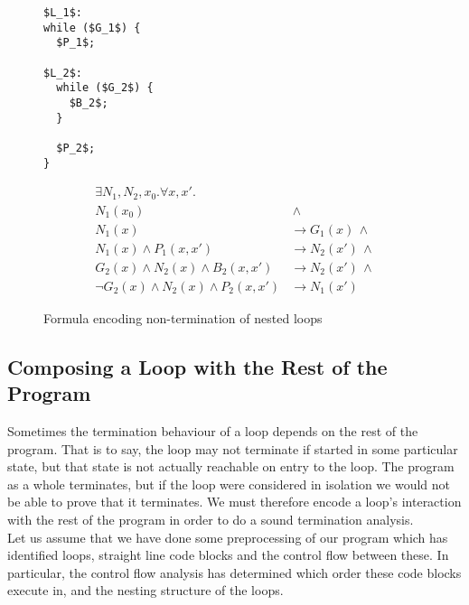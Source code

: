 \documentclass[a4paper]{llncs}
\begin{document}
\begin{figure*}
\begin{framed}
 \begin{minipage}{0.16\textwidth}
\begin{lstlisting}[mathescape=true]
$L_1$:
while ($G_1$) {
  $P_1$;

$L_2$:
  while ($G_2$) {
    $B_2$;
  }

  $P_2$;
}
\end{lstlisting}
\end{minipage}
\vline
\begin{minipage}{0.82\textwidth}
\begin{align*}
 \exists N_1, N_2, x_0 . \forall x, x' . \\
  N_1(x_0) & \, \wedge \\
  N_1(x) & \rightarrow G_1(x) \, \wedge \\
  N_1(x) \wedge P_1(x,x') & \rightarrow N_2(x') \, \wedge \\
  G_2(x) \wedge N_2(x) \wedge B_2(x,x') & \rightarrow N_2(x') \, \wedge \\
  \lnot G_2(x) \wedge N_2(x) \wedge P_2(x,x') & \rightarrow N_1(x') 
\end{align*}
\end{minipage}
\end{framed}

\caption{Formula encoding non-termination of nested loops \label{fig:nonterm-nested}}
\end{figure*}




\subsection{Composing a Loop with the Rest of the Program} \label{sec:env}

Sometimes the termination behaviour of a loop depends on the rest of the program.  That is to say,
the loop may not terminate if started in some particular state, but that state is
not actually reachable on entry to the loop.  The program as a whole
terminates, but if the loop were considered in isolation we would not be able to prove that
it terminates. We must therefore encode a loop's interaction with the rest of the program 
in order to do a sound termination analysis.\\

Let us assume that we have done some preprocessing of our program which has identified
loops, straight line code blocks and the control flow between these.  In particular,
the control flow analysis has determined which order these code blocks execute in,
and the nesting structure of the loops.
\end{document}

